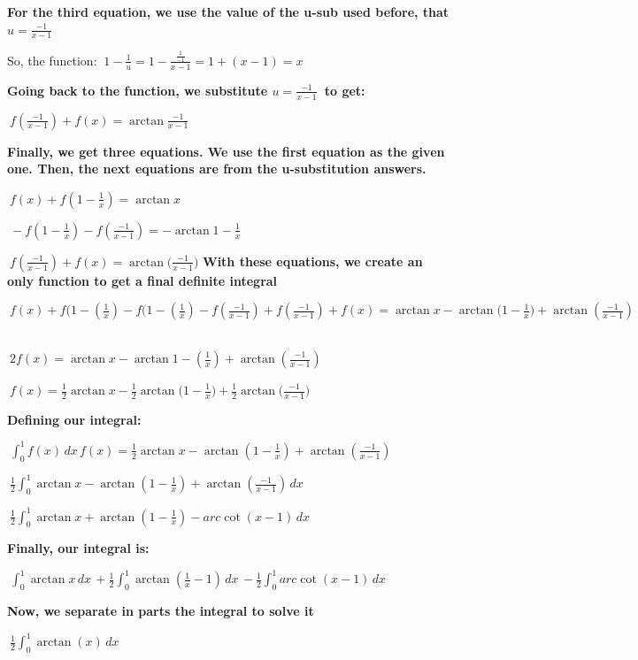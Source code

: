 \documentclass{article}
\begin{document}
\bigskip\textbf{For the third equation, we use the value of the u-sub used before, that $u= \frac{-1}{x-1} $\ } 

\bigskip So, the function: $\ 1-\frac{1}{u}=1-\frac{\frac{1}{-1}}{x-1} =1+(x-1)=x $\

\bigskip \textbf{Going back to the function, we substitute $u= \frac{-1}{x-1} $\ to get:}

\bigskip $\ f(\frac{-1}{x-1})+f(x)=\arctan\frac{-1}{x-1}$

\bigskip \textbf{Finally, we get three equations. We use the first equation as the given one. Then, the next equations are from the u-substitution answers. }

\bigskip $\ f(x)+f(1-\frac{1}{x})=\arctan{x} $\

\bigskip $\ -f(1-\frac{1}{x})-f(\frac{-1}{x-1})=-\arctan{1-\frac{1}{x}}$

\bigskip $\ f(\frac{-1}{x-1})+f(x)=\arctan({\frac{-1}{x-1})}$
\newpage
\bigskip \textbf {With these equations, we create an only function to get a final definite integral}

\bigskip $\ f(x)+f(1-(\frac{1}{x})-f(1-(\frac{1}{x})-f(\frac{-1}{x-1})+f(\frac{-1}{x-1})+f(x)=\arctan{x}-\arctan({1-\frac{1}{x})+\arctan{(\frac{-1}{x-1})}}$\

\bigskip $\ 2f(x)=\arctan{x}-\arctan{1-(\frac{1}{x})+\arctan{(\frac{-1}{x-1})}}$

\bigskip $\ f(x)=\frac{1}{2}\arctan{x}-\frac{1}{2}\arctan({1-\frac{1}{x})}+\frac{1}{2}\arctan({\frac{-1}{x-1})} $\

\bigskip\textbf{Defining our integral:}

\bigskip  $\ \int_{0}^{1} f(x)\,dx \, f(x)=\frac{1}{2}\arctan{x}-\arctan{(1-\frac{1}{x})+\arctan{(\frac{-1}{x-1})}} $\

\bigskip $\ \frac{1}{2} \int_{0}^{1}\arctan{x}-\arctan{(1-\frac{1}{x})+\arctan{(\frac{-1}{x-1})}}\,dx \, \ $\

\bigskip  $\ \frac{1}{2} \int_{0}^{1} \arctan{x}+\arctan{(1-\frac{1}{x})-arc\cot{(x-1)}}\,dx \, $

\bigskip \textbf{Finally, our integral is:}

\bigskip $\ \int_{0}^{1} \arctan{x}\,dx \,+\frac{1}{2}\int_{0}^{1} \arctan{(\frac{1}{x}-1)}\,dx \,- \frac{1}{2}\int_{0}^{1} arc\cot{(x-1)}\,dx \, $

\bigskip \textbf{Now, we separate in parts the integral to solve it}

\bigskip $\ \frac{1}{2} \int_{0}^{1} \arctan{(x)} \,dx \, $
\end{document}
